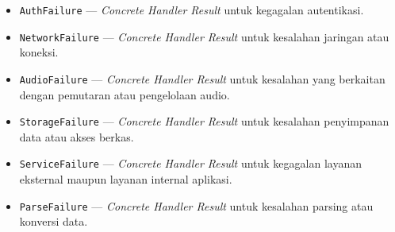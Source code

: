\documentclass[11pt]{article}
\begin{document}
\begin{itemize}
\begin{itemize}
    \item \texttt{AuthFailure} --- \textit{Concrete Handler Result} untuk kegagalan autentikasi.
    
    \item \texttt{NetworkFailure} --- \textit{Concrete Handler Result} untuk kesalahan jaringan atau koneksi.
    
    \item \texttt{AudioFailure} --- \textit{Concrete Handler Result} untuk kesalahan yang berkaitan dengan pemutaran atau pengelolaan audio.
    
    \item \texttt{StorageFailure} --- \textit{Concrete Handler Result} untuk kesalahan penyimpanan data atau akses berkas.
    
    \item \texttt{ServiceFailure} --- \textit{Concrete Handler Result} untuk kegagalan layanan eksternal maupun layanan internal aplikasi.
    
    \item \texttt{ParseFailure} --- \textit{Concrete Handler Result} untuk kesalahan parsing atau konversi data.
\end{itemize}

\end{itemize}
\end{document}
